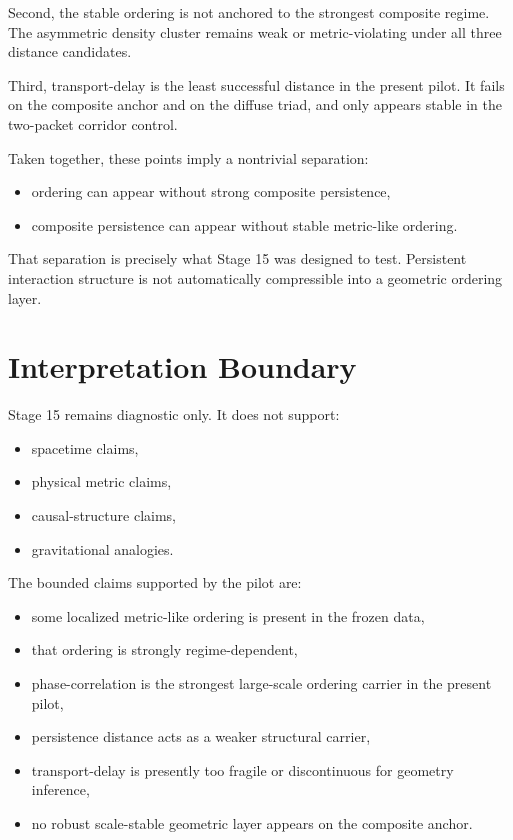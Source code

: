 \documentclass[11pt]{article}
\begin{document}
Second, the stable ordering is not anchored to the strongest composite regime. The asymmetric density cluster remains weak or metric-violating under all three distance candidates.

Third, transport-delay is the least successful distance in the present pilot. It fails on the composite anchor and on the diffuse triad, and only appears stable in the two-packet corridor control.

Taken together, these points imply a nontrivial separation:
\begin{itemize}
\item ordering can appear without strong composite persistence,
\item composite persistence can appear without stable metric-like ordering.
\end{itemize}

That separation is precisely what Stage 15 was designed to test. Persistent interaction structure is not automatically compressible into a geometric ordering layer.

\section{Interpretation Boundary}

Stage 15 remains diagnostic only. It does not support:
\begin{itemize}
\item spacetime claims,
\item physical metric claims,
\item causal-structure claims,
\item gravitational analogies.
\end{itemize}

The bounded claims supported by the pilot are:
\begin{itemize}
\item some localized metric-like ordering is present in the frozen data,
\item that ordering is strongly regime-dependent,
\item phase-correlation is the strongest large-scale ordering carrier in the present pilot,
\item persistence distance acts as a weaker structural carrier,
\item transport-delay is presently too fragile or discontinuous for geometry inference,
\item no robust scale-stable geometric layer appears on the composite anchor.
\end{itemize}
\end{document}
